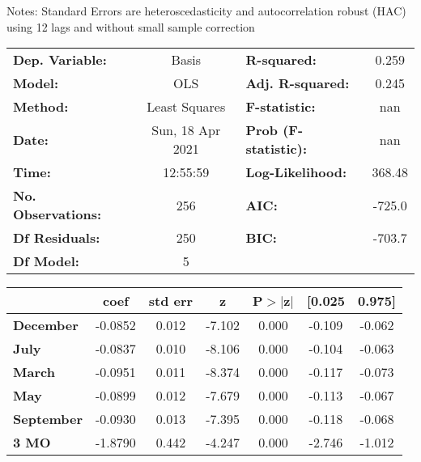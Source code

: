 Notes: \newline
 [1] Standard Errors are heteroscedasticity and autocorrelation robust (HAC) using 12 lags and without small sample correction
\begin{center}
\begin{tabular}{lclc}
\toprule
\textbf{Dep. Variable:}    &      Basis       & \textbf{  R-squared:         } &     0.259   \\
\textbf{Model:}            &       OLS        & \textbf{  Adj. R-squared:    } &     0.245   \\
\textbf{Method:}           &  Least Squares   & \textbf{  F-statistic:       } &       nan   \\
\textbf{Date:}             & Sun, 18 Apr 2021 & \textbf{  Prob (F-statistic):} &      nan    \\
\textbf{Time:}             &     12:55:59     & \textbf{  Log-Likelihood:    } &    368.48   \\
\textbf{No. Observations:} &         256      & \textbf{  AIC:               } &    -725.0   \\
\textbf{Df Residuals:}     &         250      & \textbf{  BIC:               } &    -703.7   \\
\textbf{Df Model:}         &           5      & \textbf{                     } &             \\
\bottomrule
\end{tabular}
\begin{tabular}{lcccccc}
                   & \textbf{coef} & \textbf{std err} & \textbf{z} & \textbf{P$> |$z$|$} & \textbf{[0.025} & \textbf{0.975]}  \\
\midrule
\textbf{December}  &      -0.0852  &        0.012     &    -7.102  &         0.000        &       -0.109    &       -0.062     \\
\textbf{July}      &      -0.0837  &        0.010     &    -8.106  &         0.000        &       -0.104    &       -0.063     \\
\textbf{March}     &      -0.0951  &        0.011     &    -8.374  &         0.000        &       -0.117    &       -0.073     \\
\textbf{May}       &      -0.0899  &        0.012     &    -7.679  &         0.000        &       -0.113    &       -0.067     \\
\textbf{September} &      -0.0930  &        0.013     &    -7.395  &         0.000        &       -0.118    &       -0.068     \\
\textbf{3 MO}      &      -1.8790  &        0.442     &    -4.247  &         0.000        &       -2.746    &       -1.012     \\

\end{tabular}
\end{center}
